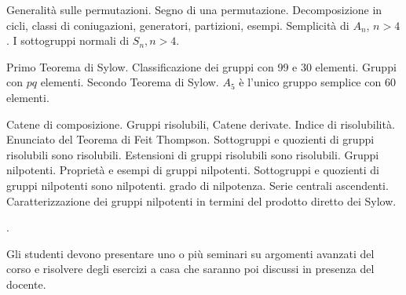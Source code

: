  Generalit\`a sulle permutazioni. Segno di una permutazione. Decomposizione in cicli, classi di coniugazioni, generatori, partizioni, esempi. Semplicit\`a di $A_n$, $n>4$. I sottogruppi normali di $S_n, n>4$.

 Primo Teorema di Sylow. Classificazione dei gruppi con 99 e 30 elementi. Gruppi con $pq$ elementi. Secondo Teorema di Sylow. $A_5$ \`e l'unico gruppo semplice con 60 elementi.

 Catene di composizione. Gruppi risolubili, Catene derivate. Indice di risolubilit\`a. Enunciato del Teorema di Feit Thompson. Sottogruppi e quozienti di gruppi risolubili sono risolubili. Estensioni di gruppi risolubili sono risolubili. Gruppi nilpotenti. Propriet\`a e esempi di gruppi nilpotenti. Sottogruppi e quozienti di gruppi nilpotenti sono nilpotenti. grado di nilpotenza. Serie centrali ascendenti. Caratterizzazione dei gruppi nilpotenti in termini del prodotto diretto dei Sylow.

\testi
\bib
{} 
 
\endbib

\bib
{} .
\endbib

\altritesti

\bib
{}   
\endbib

\bib
{} 
 
\endbib


\bib
{}   
\endbib

\bib
{}   
\endbib


\bib
{}  
\endbib

\bib
{}   
\endbib

\bib
{}   
\endbib

\bib
{} 
 
\endbib

\esami

Gli studenti devono presentare uno o pi\`{u} seminari su argomenti avanzati del corso e
risolvere degli esercizi a casa che saranno poi discussi in presenza del docente. \bye

